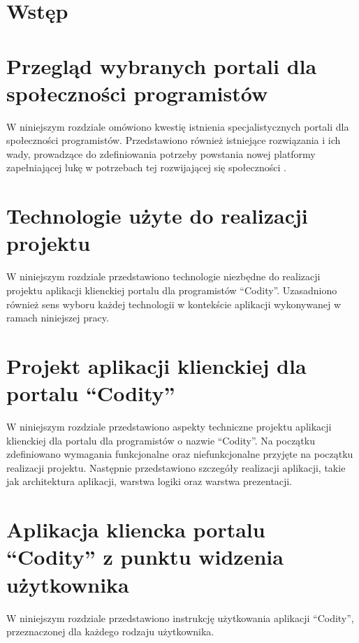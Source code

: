 \documentclass[a4paper,12pt,polish,twoside]{extreport}
\begin{document}
\pagestyle{empty}
{
    \renewcommand{\thispagestyle}[1]{}
    \tableofcontents
}
\clearpage
\pagestyle{plain}

\cleardoublepage

\chapter{Wstęp}


\chapter{Przegląd wybranych portali dla społeczności programistów}
W niniejszym rozdziale omówiono kwestię istnienia specjalistycznych portali dla społeczności programistów. Przedstawiono również istniejące rozwiązania i ich wady, prowadzące do zdefiniowania potrzeby powstania nowej platformy zapełniającej lukę w potrzebach tej rozwijającej się społeczności \cite{statystyki_ilosc_programistow}.


\chapter{Technologie użyte do realizacji projektu}
W niniejszym rozdziale przedstawiono technologie niezbędne do realizacji projektu aplikacji klienckiej portalu dla programistów ``Codity''. Uzasadniono również sens wyboru każdej technologii w kontekście aplikacji wykonywanej w ramach niniejszej pracy.


\chapter{Projekt aplikacji klienckiej dla portalu ``Codity''}
W niniejszym rozdziale przedstawiono aspekty techniczne projektu aplikacji klienckiej dla portalu dla programistów o nazwie ``Codity''. Na początku zdefiniowano wymagania funkcjonalne oraz niefunkcjonalne przyjęte na początku realizacji projektu. Następnie przedstawiono szczegóły realizacji aplikacji, takie jak architektura aplikacji, warstwa logiki oraz warstwa prezentacji.


\chapter{Aplikacja kliencka portalu ``Codity'' z punktu widzenia użytkownika}
W niniejszym rozdziale przedstawiono instrukcję użytkowania aplikacji ``Codity'', przeznaczonej dla każdego rodzaju użytkownika.

\end{document}
